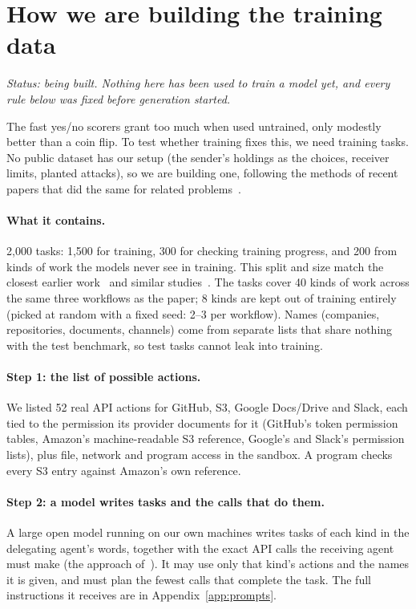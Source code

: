 \documentclass[11pt]{article}
\begin{document}
\section{How we are building the training data}
\emph{Status: being built. Nothing here has been used to train a model yet, and every rule below was fixed
before generation started.}

The fast yes/no scorers grant too much when used untrained, only modestly better than a coin flip. To test whether
training fixes this, we need training tasks. No public dataset has our setup (the sender's holdings as the
choices, receiver limits, planted attacks), so we are building one, following the methods of recent
papers that did the same for related problems~\cite{taskcond,authbench,toolpriv,noyan,astra}.

\paragraph{What it contains.} 2,000 tasks: 1,500 for training, 300 for checking training progress,
and 200 from kinds of work the models never see in training. This split and size match the closest earlier
work~\cite{taskcond} and similar studies~\cite{toolpriv}. The tasks cover 40 kinds of work across the same
three workflows as the paper; 8 kinds are kept out of training entirely (picked at random with a fixed seed:
2--3 per workflow). Names (companies, repositories, documents, channels) come from separate lists that share
nothing with the test benchmark, so test tasks cannot leak into training.

\paragraph{Step 1: the list of possible actions.} We listed 52 real API actions for GitHub, S3, Google
Docs/Drive and Slack, each tied to the permission its provider documents for it (GitHub's token permission
tables, Amazon's machine-readable S3 reference, Google's and Slack's permission lists), plus file, network and
program access in the sandbox. A program checks every S3 entry against Amazon's own reference.

\paragraph{Step 2: a model writes tasks and the calls that do them.} A large open model running on our own
machines writes tasks of each kind in the delegating agent's words, together with the exact API calls the
receiving agent must make (the approach of~\cite{selfinstruct,toolllm,apigen}). It may use only that kind's
actions and the names it is given, and must plan the fewest calls that complete the task. The full instructions
it receives are in Appendix~\ref{app:prompts}.
\end{document}
